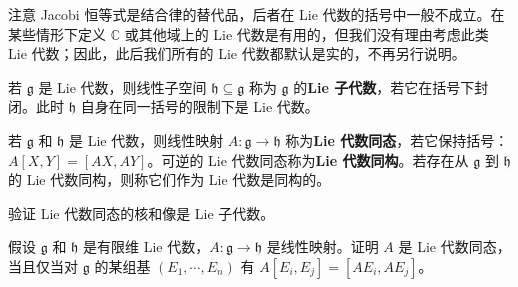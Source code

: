\documentclass[../../main.tex]{subfiles}
\begin{document}
注意 Jacobi 恒等式是结合律的替代品，后者在 Lie 代数的括号中一般不成立。在某些情形下定义 $\mathbb{C}$ 或其他域上的 Lie 代数是有用的，但我们没有理由考虑此类 Lie 代数；因此，此后我们所有的 Lie 代数都默认是实的，不再另行说明。

若 $\mathfrak{g}$ 是 Lie 代数，则线性子空间 $\mathfrak{h}\subseteq\mathfrak{g}$ 称为 $\mathfrak{g}$ 的\textbf{Lie 子代数}，若它在括号下封闭。此时 $\mathfrak{h}$ 自身在同一括号的限制下是 Lie 代数。

若 $\mathfrak{g}$ 和 $\mathfrak{h}$ 是 Lie 代数，则线性映射 $A\colon\mathfrak{g}\to\mathfrak{h}$ 称为\textbf{Lie 代数同态}，若它保持括号：$A[X,Y]=[AX,AY]$。可逆的 Lie 代数同态称为\textbf{Lie 代数同构}。若存在从 $\mathfrak{g}$ 到 $\mathfrak{h}$ 的 Lie 代数同构，则称它们作为 Lie 代数是同构的。

\begin{exercise}\label{exercise:ch08-34}
验证 Lie 代数同态的核和像是 Lie 子代数。
\end{exercise}

\begin{exercise}\label{exercise:ch08-35}
假设 $\mathfrak{g}$ 和 $\mathfrak{h}$ 是有限维 Lie 代数，$A\colon\mathfrak{g}\to\mathfrak{h}$ 是线性映射。证明 $A$ 是 Lie 代数同态，当且仅当对 $\mathfrak{g}$ 的某组基 $(E_1,\cdots ,E_n)$ 有 $A[E_i,E_j]=[AE_i,AE_j]$。
\end{exercise}
\end{document}
